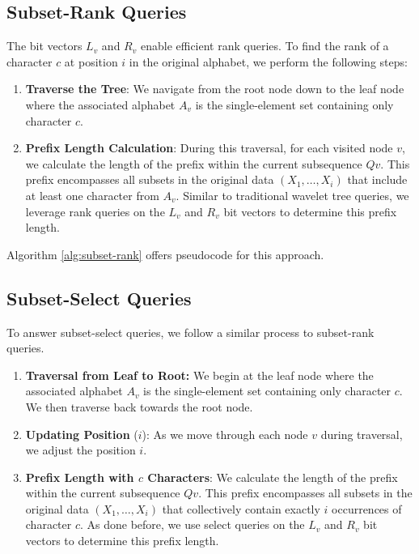 \subsection{Subset-Rank Queries} \label{sec:subset_rank_queries}

\noindent The bit vectors $L_v$ and $R_v$ enable efficient rank queries. To find the rank of a character $c$ at position $i$ in the original alphabet, we perform the following steps:
\begin{enumerate}
    \item \textbf{Traverse the Tree}: We navigate from the root node down to the leaf node where the associated alphabet $A_v$ is the single-element set containing only character $c$.
    \item \textbf{Prefix Length Calculation}: During this traversal, for each visited node $v$, we calculate the length of the prefix within the current subsequence $Qv$. This prefix encompasses all subsets in the original data $(X_1,\dots, X_i)$ that include at least one character from $A_v$. Similar to traditional wavelet tree queries, we leverage rank queries on the $L_v$ and $R_v$ bit vectors to determine this prefix length.
\end{enumerate}
Algorithm \ref{alg:subset-rank} offers pseudocode for this approach.

\subsection{Subset-Select Queries} \label{sec:subset_select_queries}

To answer subset-select queries, we follow a similar process to subset-rank queries.

\begin{enumerate}
    \item \textbf{Traversal from Leaf to Root:} We begin at the leaf node where the associated alphabet $A_v$ is the single-element set containing only character $c$. We then traverse back towards the root node.
    \item \textbf{Updating Position} ($i$): As we move through each node $v$ during traversal, we adjust the position $i$.
    \item \textbf{Prefix Length with $c$ Characters}: We calculate the length of the prefix within the current subsequence $Qv$. This prefix encompasses all subsets in the original data $(X_1,\dots, X_i)$ that collectively contain exactly $i$ occurrences of character $c$. As done before, we use select queries on the $L_v$ and $R_v$ bit vectors to determine this prefix length.
\end{enumerate}

